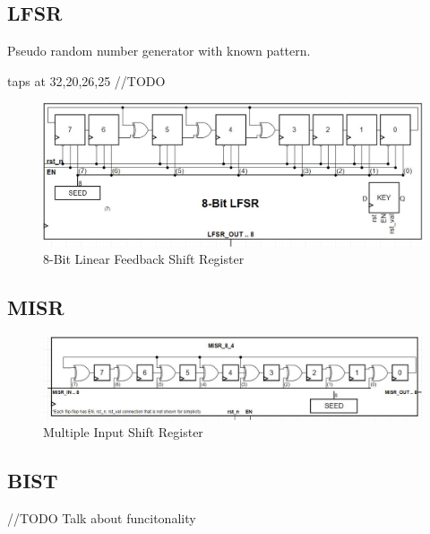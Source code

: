\documentclass[11pt]{article}
\begin{document}
	\subsection{LFSR}
	
		Pseudo random number generator with known pattern.
		
		taps at 32,20,26,25
		//TODO
		
		\begin{figure}[H]
			\centering
			\includegraphics[width=\textwidth,height=\dimexpr\textheight-4\baselineskip-\abovecaptionskip-\belowcaptionskip\relax,keepaspectratio]{Pictures/LFSR}
			\caption{8-Bit Linear Feedback Shift Register}
			\label{fig:lfsr-block}
		\end{figure}
	
	\subsection{MISR}
	
	
		\begin{figure}[H]
			\centering
			\includegraphics[width=\textwidth,height=\dimexpr\textheight-4\baselineskip-\abovecaptionskip-\belowcaptionskip\relax,keepaspectratio]{Pictures/MISR}
			\caption{Multiple Input Shift Register}
			\label{fig:misr-block}
		\end{figure}
	
	\subsection{BIST}
	
		//TODO Talk about funcitonality
	
\end{document}
